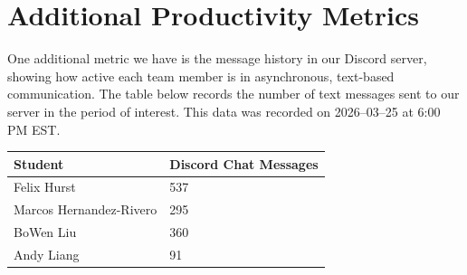 \documentclass{article}
\begin{document}
\newpage

\section{Additional Productivity Metrics}

One additional metric we have is the message history in our Discord server,
showing how active each team member is in asynchronous, text-based communication.
The table below records the number of text messages sent to our server in the period
of interest. This data was recorded on 2026--03--25 at 6:00 PM EST.\\

\begin{table}[H]
\centering
\begin{tabular}{ll}
\toprule
\textbf{Student} & \textbf{Discord Chat Messages}\\
\midrule
Felix Hurst & 537\\
Marcos Hernandez-Rivero & 295\\
BoWen Liu & 360\\
Andy Liang & 91\\
\bottomrule
\end{tabular}
\end{table}
\end{document}
